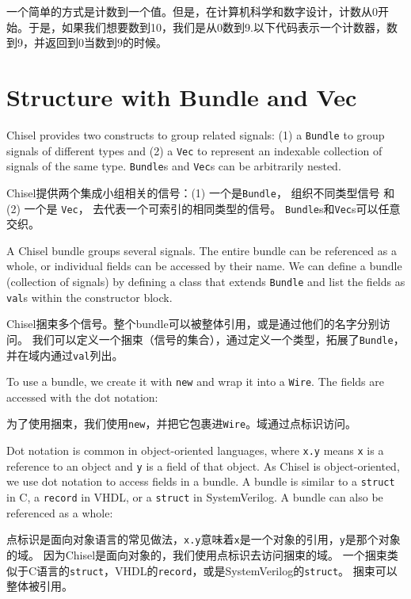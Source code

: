 \documentclass[%
    10pt,
    headinclude, footexclude,
    openright, %
    notitlepage,
    cleardoubleempty,
    headsepline,
    pointlessnumbers,
    bibtotoc, idxtotoc,
    ]{scrbook}
\newcommand{\code}[1]{{\small{\texttt{#1}}}}
\begin{document}
一个简单的方式是计数到一个值。但是，在计算机科学和数字设计，计数从0开始。于是，如果我们想要数到10，我们是从0数到9.以下代码表示一个计数器，数到9，并返回到0当数到9的时候。



\section{Structure with Bundle and Vec}

Chisel provides two constructs to group related signals: (1) a \code{Bundle} to group
signals of different types and (2) a \code{Vec} to represent an indexable collection of signals
of the same type.
\code{Bundle}s and \code{Vec}s can be arbitrarily nested.

Chisel提供两个集成小组相关的信号：(1) 一个是\code{Bundle}， 组织不同类型信号 和 
(2) 一个是 \code{Vec}， 去代表一个可索引的相同类型的信号。
\code{Bundle}s和\code{Vec}s可以任意交织。


A Chisel bundle groups several signals. The entire bundle can be referenced
as a whole, or individual fields can be accessed by their name.
We can define a bundle (collection of signals) by defining a class that
extends \code{Bundle} and list the fields as \code{val}s within the constructor block.

Chisel捆束多个信号。整个bundle可以被整体引用，或是通过他们的名字分别访问。
我们可以定义一个捆束（信号的集合），通过定义一个类型，拓展了\code{Bundle}，
并在域内通过\code{val}列出。



\noindent To use a bundle, we create it with \code{new} and wrap it into a \code{Wire}.
The fields are accessed with the dot notation:

\noindent 为了使用捆束，我们使用\code{new}，并把它包裹进\code{Wire}。域通过点标识访问。



Dot notation is common in object-oriented languages, where \code{x.y} means
\code{x} is a reference to an object and \code{y} is a field of that object.
As Chisel is object-oriented, we use dot notation to access fields in a bundle.
A bundle is similar to a \code{struct} in C, a \code{record} in VHDL, or a
\code{struct} in SystemVerilog.
A bundle can also be referenced as a whole:

点标识是面向对象语言的常见做法，\code{x.y}意味着\code{x}是一个对象的引用，\code{y}是那个对象的域。
因为Chisel是面向对象的，我们使用点标识去访问捆束的域。
一个捆束类似于C语言的\code{struct}，VHDL的\code{record}，或是SystemVerilog的\code{struct}。
捆束可以整体被引用。
\end{document}
